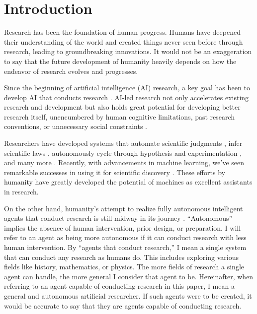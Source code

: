 \section{Introduction}
Research has been the foundation of human progress. Humans have deepened their understanding of the world and created things never seen before through research, leading to groundbreaking innovations. It would not be an exaggeration to say that the future development of humanity heavily depends on how the endeavor of research evolves and progresses.

Since the beginning of artificial intelligence (AI) research, a key goal has been to develop AI that conducts research \cite{zenil2023future}. AI-led research not only accelerates existing research and development but also holds great potential for developing better research itself, unencumbered by human cognitive limitations, past research conventions, or unnecessary social constraints \cite{zenil2023future,kitano2021nobel}.

Researchers have developed systems that automate scientific judgments \cite{lindsay1993dendral}, infer scientific laws \cite{langley1987scientific}, autonomously cycle through hypothesis and experimentation \cite{king2004functional}, and many more \cite{zenil2023future,zenil2023}. Recently, with advancements in machine learning, we've seen remarkable successes in using it for scientific discovery \cite{wang2023scientific,xu2021artificial,zhang2023artificial,ai4science2023impact}. These efforts  by humanity have greatly developed the potential of machines as excellent assistants in research.

On the other hand, humanity's attempt to realize fully autonomous intelligent agents that conduct research is still midway in its journey \cite{zenil2023future,coley2020autonomousII}. ``Autonomous'' implies the absence of human intervention, prior design, or preparation. I will refer to an agent as being more autonomous if it can conduct research with less human intervention. By ``agents that conduct research,'' I mean a single system that can conduct any research as humans do. This includes exploring various fields like history, mathematics, or physics. The more fields of research a single agent can handle, the more general I consider that agent to be. Hereinafter, when referring to an agent capable of conducting research in this paper, I mean a general and autonomous artificial researcher. If such agents were to be created, it would be accurate to say that they are agents capable of conducting research.

